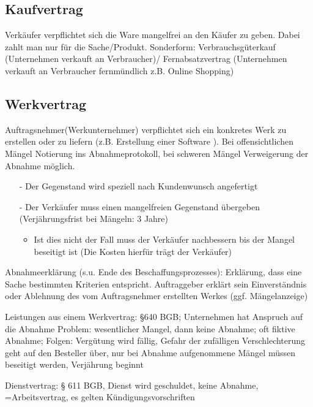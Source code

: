 \documentclass[10pt]{article}
\begin{document}
\subsection{Kaufvertrag} 
Verkäufer verpflichtet sich die Ware mangelfrei an den Käufer zu geben. Dabei zahlt man nur für die Sache/Produkt. 
Sonderform: Verbrauchsgüterkauf (Unternehmen verkauft an Verbraucher)/
Fernabsatzvertrag (Unternehmen verkauft an Verbraucher fernmündlich z.B. Online Shopping)

\subsection{Werkvertrag} 
Auftragsnehmer(Werkunternehmer) verpflichtet sich ein konkretes Werk zu erstellen oder zu liefern  (z.B. Erstellung einer Software ). Bei offensichtlichen Mängel \textrightarrow\space Notierung ins Abnahmeprotokoll, bei schweren Mängel \textrightarrow\space Verweigerung der Abnahme möglich.

\begin{itemize}
    \item[-] Der Gegenstand wird speziell nach Kundenwunsch angefertigt
    \item[-]Der Verkäufer muss einen mangelfreien Gegenstand übergeben (Verjährungsfrist bei Mängeln: 3 Jahre)
    \begin{itemize}
        \item Ist dies nicht der Fall muss der Verkäufer nachbessern bis der Mangel beseitigt ist (Die Kosten hierfür trägt der Verkäufer)
    \end{itemize}

\end{itemize}

Abnahmeerklärung (s.u. Ende des Beschaffungsprozesses): Erklärung, dass eine Sache bestimmten Kriterien entspricht. Auftraggeber erklärt sein Einverständnis oder Ablehnung des vom Auftragsnehmer erstellten Werkes (ggf. Mängelanzeige)

Leistungen aus einem Werkvertrag: §640 BGB; Unternehmen hat Anspruch auf die Abnahme
Problem: wesentlicher Mangel, dann keine Abnahme; oft fiktive Abnahme; Folgen: Vergütung wird fällig, Gefahr der zufälligen Verschlechterung geht auf den Besteller über, nur bei Abnahme aufgenommene Mängel müssen beseitigt werden, Verjährung beginnt

Dienstvertrag: § 611 BGB, Dienst wird geschuldet, keine Abnahme, =Arbeitsvertrag, es gelten Kündigungsvorschriften
\end{document}
